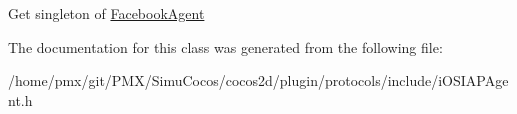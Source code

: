 Get singleton of \hyperlink{classcocos2d_1_1plugin_1_1FacebookAgent}{Facebook\+Agent} 

The documentation for this class was generated from the following file\+:\begin{DoxyCompactItemize}
\item 
/home/pmx/git/\+P\+M\+X/\+Simu\+Cocos/cocos2d/plugin/protocols/include/i\+O\+S\+I\+A\+P\+Agent.\+h\end{DoxyCompactItemize}
